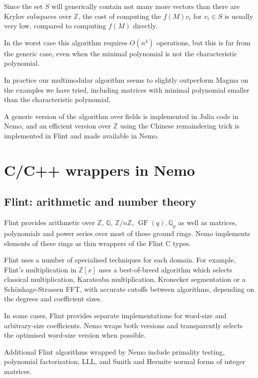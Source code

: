 \documentclass{sig-alternate-05-2015}
\begin{document}
Since the set $S$ will generically contain not many more vectors than there are
Krylov subspaces over $\mathbb{Z}$, the cost of computing the $f(M)v_i$ for
$v_i \in S$ is usually very low, compared to computing $f(M)$ directly.

In the worst case this algorithm requires $O(n^4)$ operations, but
this is far from the generic case, even when the minimal polynomial is not
the characteristic polynomial.

In practice our multimodular algorithm seems to slightly outperform Magma on the
examples we have tried, including matrices with minimal polynomial smaller 
than the characteristic polynomial.

A generic version of the algorithm over fields is implemented in Julia code in
Nemo, and an efficient version over $\mathbb{Z}$ using the Chinese remaindering
trick is implemented in Flint and made available in Nemo.

\section{C/C++ wrappers in Nemo}
\label{sect:wrappers}

\subsection{Flint: arithmetic and number theory}

Flint provides arithmetic over
$\mathbb{Z}$, $\mathbb{Q}$, $\mathbb{Z}/n\mathbb{Z}$,
$\operatorname{GF}(q), \mathbb{Q}_p$
as well as matrices, polynomials and power series over most
of these ground rings.
Nemo implements elements of these rings as thin wrappers of the
Flint C types.

Flint uses a number of specialised techniques for each domain.
For example, Flint's multiplication in $\mathbb{Z}[x]$
uses a best-of-breed algorithm which selects classical multiplication,
Karatsuba multiplication, Kronecker segmentation or a 
Sch\"{o}nhage-Strassen FFT, with accurate cutoffs
between algorithms, depending on the degrees and coefficient sizes.

In some cases, Flint provides separate implementations
for word-size and arbitrary-size coefficients.
Nemo wraps both versions and transparently selects the
optimised word-size version when possible.

Additional Flint algorithms wrapped by Nemo include
primality testing, polynomial factorisation, LLL, and Smith and Hermite
normal forms of integer matrices.
\end{document}

